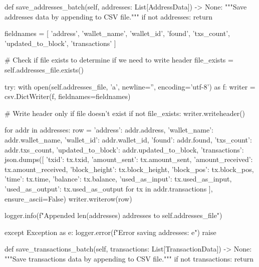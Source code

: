 \begin{codelisting}[language=Python, caption=Основной скрипт сбора данных]
    def save_addresses_batch(self, addresses: List[AddressData]) -> None:
        """Save addresses data by appending to CSV file."""
        if not addresses:
            return
            
        fieldnames = [
            'address', 'wallet_name', 'wallet_id', 'found', 
            'txs_count', 'updated_to_block', 'transactions'
        ]
        
        # Check if file exists to determine if we need to write header
        file_exists = self.addresses_file.exists()
        
        try:
            with open(self.addresses_file, 'a', newline='', encoding='utf-8') as f:
                writer = csv.DictWriter(f, fieldnames=fieldnames)
                
                # Write header only if file doesn't exist
                if not file_exists:
                    writer.writeheader()
                
                for addr in addresses:
                    row = {
                        'address': addr.address,
                        'wallet_name': addr.wallet_name,
                        'wallet_id': addr.wallet_id,
                        'found': addr.found,
                        'txs_count': addr.txs_count,
                        'updated_to_block': addr.updated_to_block,
                        'transactions': json.dumps([
                            {
                                'txid': tx.txid,
                                'amount_sent': tx.amount_sent,
                                'amount_received': tx.amount_received,
                                'block_height': tx.block_height,
                                'block_pos': tx.block_pos,
                                'time': tx.time,
                                'balance': tx.balance,
                                'used_as_input': tx.used_as_input,
                                'used_as_output': tx.used_as_output
                            } for tx in addr.transactions
                        ], ensure_ascii=False)
                    }
                    writer.writerow(row)
            
            logger.info(f"Appended {len(addresses)} addresses to {self.addresses_file}")
            
        except Exception as e:
            logger.error(f"Error saving addresses: {e}")
            raise
    
    def save_transactions_batch(self, transactions: List[TransactionData]) -> None:
        """Save transactions data by appending to CSV file."""
        if not transactions:
            return
            

\end{codelisting}
